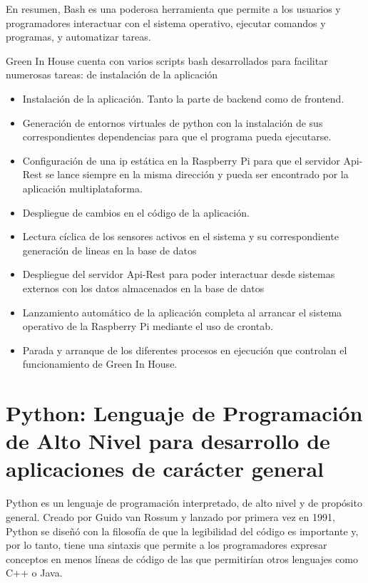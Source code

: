 En resumen, Bash es una poderosa herramienta que permite a los usuarios y programadores interactuar con el sistema operativo, ejecutar comandos y programas, y automatizar tareas. 

Green In House cuenta con varios scripts bash desarrollados para facilitar numerosas tareas: de instalación de la aplicación

\begin{itemize}

    \item Instalación de la aplicación. Tanto la parte de backend como de frontend.

    \item Generación de entornos virtuales de python con la instalación de sus correspondientes dependencias para que el programa pueda ejecutarse.

    \item Configuración de una ip estática en la Raspberry Pi para que el servidor Api-Rest se lance siempre en la misma dirección y pueda ser encontrado por la aplicación multiplataforma.

    \item Despliegue de cambios en el código de la aplicación.

    \item Lectura cíclica de los sensores activos en el sistema y su correspondiente generación de lineas en la base de datos

    \item Despliegue del servidor Api-Rest para poder interactuar desde sistemas externos con los datos almacenados en la base de datos

    \item Lanzamiento automático de la aplicación completa al arrancar el sistema operativo de la Raspberry Pi mediante el uso de crontab.

    \item Parada y arranque de los diferentes procesos en ejecución que controlan el funcionamiento de Green In House.

\end{itemize}

\section{Python: Lenguaje de Programación de Alto Nivel para desarrollo de aplicaciones de carácter general}

Python \citep{wiki:python} es un lenguaje de programación interpretado, de alto nivel y de propósito general. Creado por Guido van Rossum y lanzado por primera vez en 1991, Python se diseñó con la filosofía de que la legibilidad del código es importante y, por lo tanto, tiene una sintaxis que permite a los programadores expresar conceptos en menos líneas de código de las que permitirían otros lenguajes como C++ o Java.

